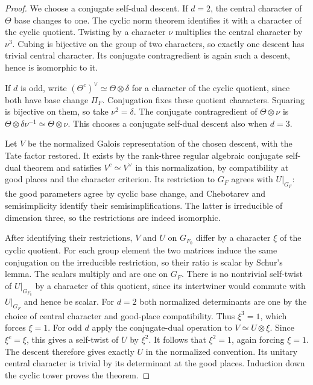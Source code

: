 \documentclass[a4paper,11pt]{article}
\theoremstyle{definition}
\theoremstyle{remark}
\numberwithin{equation}{section}
\begin{document}
\begin{proof}
We choose a conjugate self-dual descent. If \(d=2\), the central
character of \(\Theta\) base changes to one. The cyclic norm
theorem identifies it with a character of the cyclic quotient.
Twisting by a character \(\nu\) multiplies the central character
by \(\nu^3\). Cubing is bijective on the group of two characters,
so exactly one descent has trivial central character. Its
conjugate contragredient is again such a descent, hence is
isomorphic to it.

If \(d\) is odd, write
\((\Theta^c)^\vee\simeq\Theta\otimes\delta\) for a character
of the cyclic quotient, since both have base change \(\Pi_F\).
Conjugation fixes these quotient characters. Squaring is
bijective on them, so take \(\nu^2=\delta\). The conjugate
contragredient of \(\Theta\otimes\nu\) is
\(\Theta\otimes\delta\nu^{-1}\simeq\Theta\otimes\nu\).
This chooses a conjugate self-dual descent also when \(d=3\).

Let \(V\) be the normalized Galois representation of the chosen
descent, with the Tate factor restored. It exists by the
rank-three regular algebraic conjugate self-dual theorem and
satisfies \(V^c\simeq V^\vee\) in this normalization, by
compatibility at good places and the character criterion.
Its restriction to \(G_F\) agrees with \(U|_{G_F}\): the good
parameters agree by cyclic base change, and Chebotarev and
semisimplicity identify their semisimplifications. The latter
is irreducible of dimension three, so the restrictions are
indeed isomorphic.\,\cite{VIII-VI-V-shin,VIII-VI-I-ac123}

After identifying their restrictions, \(V\) and \(U\) on
\(G_{F_0}\) differ by a character \(\xi\) of the cyclic quotient.
For each group element the two matrices induce the same
conjugation on the irreducible restriction, so their ratio
is scalar by Schur's lemma. The scalars multiply and are one
on \(G_F\). There is no nontrivial self-twist of \(U|_{G_{F_0}}\)
by a character of this quotient, since its intertwiner would
commute with \(U|_{G_F}\) and hence be scalar. For \(d=2\) both
normalized determinants are one by the choice of central
character and good-place compatibility. Thus \(\xi^3=1\), which
forces \(\xi=1\). For odd \(d\) apply the conjugate-dual operation
to \(V\simeq U\otimes\xi\). Since \(\xi^c=\xi\), this gives a
self-twist of \(U\) by \(\xi^2\). It follows that \(\xi^2=1\),
again forcing \(\xi=1\). The descent therefore gives exactly
\(U\) in the normalized convention. Its unitary central character
is trivial by its determinant at the good places. Induction down
the cyclic tower proves the theorem.
\end{proof}
\end{document}

